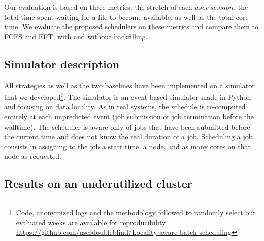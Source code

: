 \documentclass[conference]{IEEEtran}
\newcommand{\us}{\ensuremath{\mathit{user~session}}\xspace}
\begin{document}
Our evaluation is based on three metrics: the stretch of each \us, the total time spent waiting for a file to become available, as well as the total core time.
We evaluate the proposed schedulers on these metrics and compare them to FCFS and EFT, with and without backfilling.

\subsection{Simulator description}
All strategies as well as the two baselines have been implemented
on a simulator that we developed\footnote{Code, anonymized logs and the methodology followed to randomly select our evaluated weeks are available for reproducibility: \url{https://github.com/userdoubleblind/Locality-aware-batch-scheduling}}.
The simulator is an event-based simulator made in Python and focusing on data locality.
As in real systems, the schedule is re-computed entirely at each unpredicted event (job submission or job termination before the walltime).
The scheduler is aware only of jobs that have been submitted before the current time and does not know the real duration of a job.
Scheduling a job consists in assigning to the job a start time, a node, and as many cores on that node as requested.

\subsection{Results on an underutilized cluster}\label{sec.40}
\end{document}
